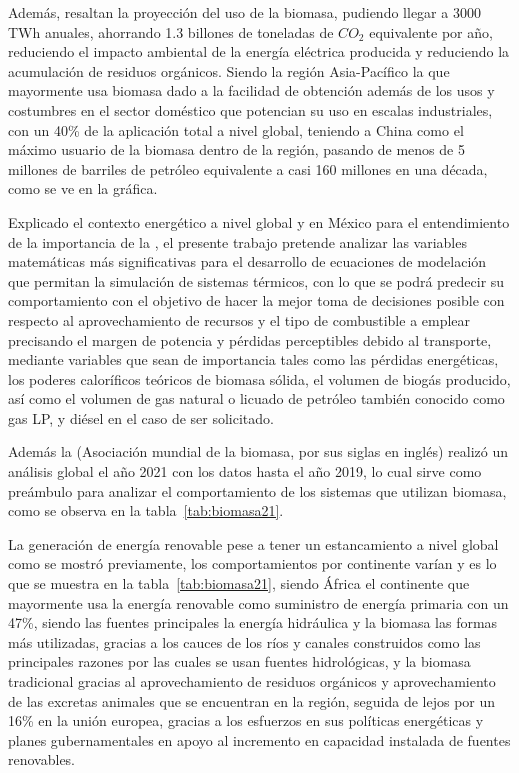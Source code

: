 Además, \textcite{ANTAR2021} resaltan la proyección del uso de la biomasa, pudiendo llegar a 3000 TWh anuales, ahorrando 1.3 billones de toneladas de $CO_{2}$ equivalente por año, reduciendo el impacto ambiental de la energía eléctrica producida y reduciendo la acumulación de residuos orgánicos. Siendo la región Asia-Pacífico la que mayormente usa biomasa dado a la facilidad de obtención además de los usos y costumbres en el sector doméstico que potencian su uso en escalas industriales, con un 40\% de la aplicación total a nivel global, teniendo a China como el máximo usuario de la biomasa dentro de la región, pasando de menos de 5 millones de barriles de petróleo equivalente a casi 160 millones en una década, como se ve en la gráfica.


Explicado el contexto energético a nivel global y en México para el entendimiento de la importancia de la , el presente trabajo pretende analizar las variables matemáticas más significativas para el desarrollo de ecuaciones de modelación que permitan la simulación de sistemas térmicos, con lo que se podrá predecir su comportamiento con el objetivo de hacer la mejor toma de decisiones posible con respecto al aprovechamiento de recursos y el tipo de combustible a emplear precisando el margen de potencia y pérdidas perceptibles debido al transporte, mediante variables que sean de importancia tales como las pérdidas energéticas, los poderes caloríficos teóricos de biomasa sólida, el volumen de biogás producido, así como el volumen de gas natural o licuado de petróleo también conocido como gas LP, y diésel en el caso de ser solicitado.

Además la \textcite{wba2021} (Asociación mundial de la biomasa, por sus siglas en inglés) realizó un análisis global el año 2021 con los datos hasta el año 2019, lo cual sirve como preámbulo para analizar el comportamiento de los sistemas que utilizan biomasa, como se observa en la tabla~\ref{tab:biomasa21}.


La generación de energía renovable pese a tener un estancamiento a nivel global como se mostró previamente, los comportamientos por continente varían y es lo que se muestra en la tabla~\ref{tab:biomasa21}, siendo África el continente que mayormente usa la energía renovable como suministro de energía primaria con un 47\%, siendo las fuentes principales la energía hidráulica y la biomasa las formas más utilizadas, gracias a los cauces de los ríos y canales construidos como las principales razones por las cuales se usan fuentes hidrológicas, y la biomasa tradicional gracias al aprovechamiento de residuos orgánicos y aprovechamiento de las excretas animales que se encuentran en la región, seguida de lejos por un 16\% en la unión europea, gracias a los esfuerzos en sus políticas energéticas y planes gubernamentales en apoyo al incremento en capacidad instalada de fuentes renovables.

